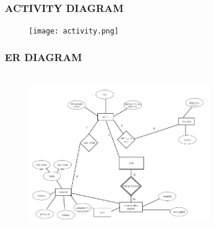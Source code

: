 \documentclass{beamer} %
\theoremstyle{definition} %
\begin{document}
\begin{frame}
\frametitle{ACTIVITY DIAGRAM}
\begin{figure}[center]
\texttt{[image: activity.png]}
\end{figure}
\end{frame}

\begin{frame}
\frametitle{ER DIAGRAM}
\begin{figure}[center]
\includegraphics[width=8cm,height=7cm]{err.png}
\end{figure}
\end{frame}
\end{document}
